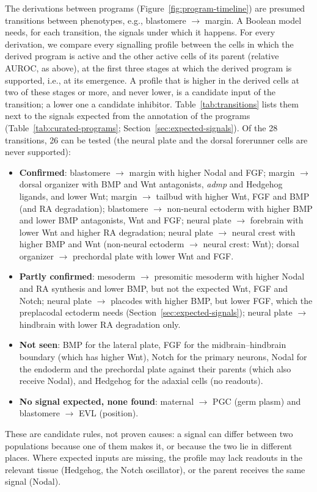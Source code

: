 \documentclass[11pt,a4paper]{article}
\begin{document}
The derivations between programs (Figure~\ref{fig:program-timeline}) are presumed transitions between phenotypes, e.g., blastomere $\rightarrow$ margin. A Boolean model needs, for each transition, the signals under which it happens. For every derivation, we compare every signalling profile between the cells in which the derived program is active and the other active cells of its parent (relative AUROC, as above), at the first three stages at which the derived program is supported, i.e., at its emergence. A profile that is higher in the derived cells at two of these stages or more, and never lower, is a candidate input of the transition; a lower one a candidate inhibitor. Table~\ref{tab:transitions} lists them next to the signals expected from the annotation of the programs (Table~\ref{tab:curated-programs}; Section~\ref{sec:expected-signals}). Of the 28 transitions, 26 can be tested (the neural plate and the dorsal forerunner cells are never supported):
\begin{itemize}
	\item \textbf{Confirmed}: blastomere $\rightarrow$ margin with higher Nodal and FGF; margin $\rightarrow$ dorsal organizer with BMP and Wnt antagonists, \emph{admp} and Hedgehog ligands, and lower Wnt; margin $\rightarrow$ tailbud with higher Wnt, FGF and BMP (and RA degradation); blastomere $\rightarrow$ non-neural ectoderm with higher BMP and lower BMP antagonists, Wnt and FGF; neural plate $\rightarrow$ forebrain with lower Wnt and higher RA degradation; neural plate $\rightarrow$ neural crest with higher BMP and Wnt (non-neural ectoderm $\rightarrow$ neural crest: Wnt); dorsal organizer $\rightarrow$ prechordal plate with lower Wnt and FGF.
	\item \textbf{Partly confirmed}: mesoderm $\rightarrow$ presomitic mesoderm with higher Nodal and RA synthesis and lower BMP, but not the expected Wnt, FGF and Notch; neural plate $\rightarrow$ placodes with higher BMP, but lower FGF, which the preplacodal ectoderm needs (Section~\ref{sec:expected-signals}); neural plate $\rightarrow$ hindbrain with lower RA degradation only.
	\item \textbf{Not seen}: BMP for the lateral plate, FGF for the midbrain--hindbrain boundary (which has higher Wnt), Notch for the primary neurons, Nodal for the endoderm and the prechordal plate against their parents (which also receive Nodal), and Hedgehog for the adaxial cells (no readouts).
	\item \textbf{No signal expected, none found}: maternal $\rightarrow$ PGC (germ plasm) and blastomere $\rightarrow$ EVL (position).
\end{itemize}
These are candidate rules, not proven causes: a signal can differ between two populations because one of them makes it, or because the two lie in different places. Where expected inputs are missing, the profile may lack readouts in the relevant tissue (Hedgehog, the Notch oscillator), or the parent receives the same signal (Nodal).
\end{document}
